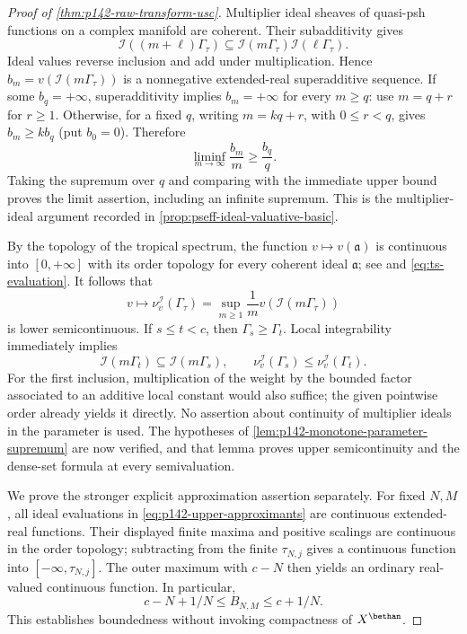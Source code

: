 \begin{proof}[Proof of \cref{thm:p142-raw-transform-usc}]
Multiplier ideal sheaves of quasi-psh functions on a complex manifold
are coherent. Their subadditivity \cite[Theorem~2.6(ii)]{DEL00} gives
\[
 \mathcal I((m+\ell)\Gamma_\tau)
 \subseteq\mathcal I(m\Gamma_\tau)
               \mathcal I(\ell\Gamma_\tau).
\]
Ideal values reverse inclusion and add under multiplication. Hence
$b_m=v(\mathcal I(m\Gamma_\tau))$ is a nonnegative extended-real
superadditive sequence. If some $b_q=+\infty$, superadditivity implies
$b_m=+\infty$ for every $m\geq q$: use $m=q+r$ for $r\geq1$.
Otherwise, for a fixed $q$, writing $m=kq+r$, with $0\leq r<q$, gives
$b_m\geq kb_q$ (put $b_0=0$). Therefore
\[
 \liminf_{m\to\infty}\frac{b_m}{m}\geq\frac{b_q}{q}.
\]
Taking the supremum over $q$ and comparing with the immediate upper
bound proves the limit assertion, including an infinite supremum. This
is the multiplier-ideal argument recorded in
\cref{prop:pseff-ideal-valuative-basic}.

By the topology of the tropical spectrum, the function
$v\mapsto v(\mathfrak a)$ is continuous into $[0,+\infty]$ with its
order topology for every coherent ideal $\mathfrak a$; see
\cite[Definition~1.3.1]{MP24} and \eqref{eq:ts-evaluation}.
It follows that
\[
 v\longmapsto\nu_v^{\mathcal I}(\Gamma_\tau)
   =\sup_{m\geq1}\frac1m
          v(\mathcal I(m\Gamma_\tau))
\]
is lower semicontinuous. If $s\leq t<c$, then
$\Gamma_s\geq\Gamma_t$. Local integrability immediately implies
\[
 \mathcal I(m\Gamma_t)\subseteq\mathcal I(m\Gamma_s),
 \qquad
 \nu_v^{\mathcal I}(\Gamma_s)
       \leq\nu_v^{\mathcal I}(\Gamma_t).
\]
For the first inclusion, multiplication of the weight by the bounded
factor associated to an additive local constant would also suffice;
the given pointwise order already yields it directly. No assertion
about continuity of multiplier ideals in the parameter is used.
The hypotheses of \cref{lem:p142-monotone-parameter-supremum} are now
verified, and that lemma proves upper semicontinuity and the dense-set
formula at every semivaluation.

We prove the stronger explicit approximation assertion separately.
For fixed $N,M$, all ideal evaluations in
\eqref{eq:p142-upper-approximants} are continuous extended-real
functions. Their displayed finite maxima and positive scalings are
continuous in the order topology; subtracting from the finite
$\tau_{N,j}$ gives a continuous function into $[-\infty,\tau_{N,j}]$.
The outer maximum with $c-N$ then yields an ordinary real-valued
continuous function. In particular,
\[
        c-N+1/N\leq B_{N,M}\leq c+1/N.
\]
This establishes boundedness without invoking compactness of $X^{\bethan}$.


\end{proof}

